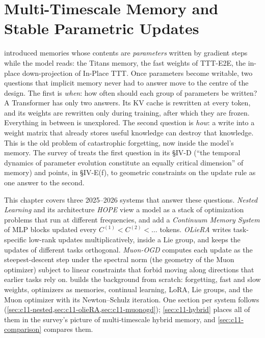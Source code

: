 \chapter{Multi-Timescale Memory and Stable Parametric Updates}\label{ch:multiscale}

 introduced memories whose contents are \emph{parameters} written by gradient
steps while the model reads: the Titans memory, the fast weights of TTT-E2E, the in-place
down-projection of In-Place TTT. Once parameters become writable, two questions that implicit
memory never had to answer move to the centre of the design. The first is \emph{when}: how often
should each group of parameters be written? A Transformer has only two answers. Its KV cache is
rewritten at every token, and its weights are rewritten only during training, after which they
are frozen. Everything in between is unexplored. The second question is \emph{how}: a write into
a weight matrix that already stores useful knowledge can destroy that knowledge. This is the old
problem of catastrophic forgetting, now inside the model's memory. The survey of
\citet{zhoubian2026memory} treats the first question in its \S IV-D (``the temporal dynamics of
parameter evolution constitute an equally critical dimension'' of memory) and points, in
\S IV-E(f), to geometric constraints on the update rule as one answer to the second.

This chapter covers three 2025--2026 systems that answer these questions. \emph{Nested Learning}
and its architecture \emph{HOPE} \citep{behrouz2025nested} view a model as a stack of
optimization problems that run at different frequencies, and add a \emph{Continuum Memory
System} of MLP blocks updated every $C^{(1)} < C^{(2)} < \dots$ tokens. \emph{OLieRA}
\citep{cao2025olora} writes task-specific low-rank updates multiplicatively, inside a Lie group,
and keeps the updates of different tasks orthogonal. \emph{Muon-OGD} \citep{lu2026muonogd}
computes each update as the steepest-descent step under the spectral norm (the geometry of the
Muon optimizer) subject to linear constraints that forbid moving along directions that earlier
tasks rely on.  builds the background from scratch: forgetting, fast and
slow weights, optimizers as memories, continual learning, LoRA, Lie groups, and the Muon
optimizer with its Newton--Schulz iteration. One section per system follows
(\cref{sec:c11-nested,sec:c11-olieRA,sec:c11-muonogd}); \cref{sec:c11-hybrid} places all of them
in the survey's picture of multi-timescale hybrid memory, and \cref{sec:c11-comparison} compares
them.

